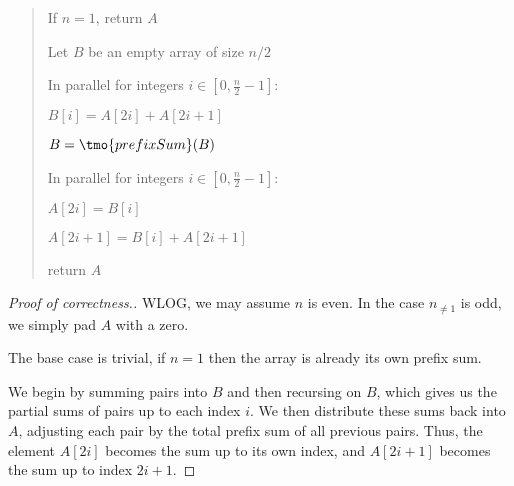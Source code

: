 \documentclass[10pt]{article}
\begin{document}
\begin{quote}

\begin{steps}
  \item If $ n=1 $, return $ A $
  \item Let $ B $ be an empty array of size $ n/2 $
  \item In parallel for integers $ i\in [0, \frac{n}{2}-1]$: %
  \begin{steps}
    \item $ B[i] = A[2i] + A[2i + 1] $
  \end{steps}
  \item $ B = \tmo{prefixSum}(B) $ %
  \item In parallel for integers $ i \in [0, \frac{n}{2}-1] $:
  \begin{steps}
    \item $ A[2i] = B[i] $
    \item $ A[2i+1] = B[i] + A[2i+1] $
  \end{steps}
  \item return $ A $
\end{steps}
\end{quote}

\begin{proof}[Proof of correctness.]
  WLOG, we may assume $ n $ is even.
  In the case $ n_{\neq 1} $ is odd, we simply pad $ A $ with a zero.

  The base case is trivial, if $ n=1 $ then the array is already its own prefix sum.

  We begin by summing pairs into $ B $ and then recursing on $ B $, which gives us the partial sums of pairs up to each index $ i $.
  We then distribute these sums back into $ A $, adjusting each pair by the total prefix sum of all previous pairs.
  Thus, the element $ A[2i] $ becomes the sum up to its own index, and $ A[2i+1] $ becomes the sum up to index $ 2i+1 $.
\end{proof}
\end{document}
